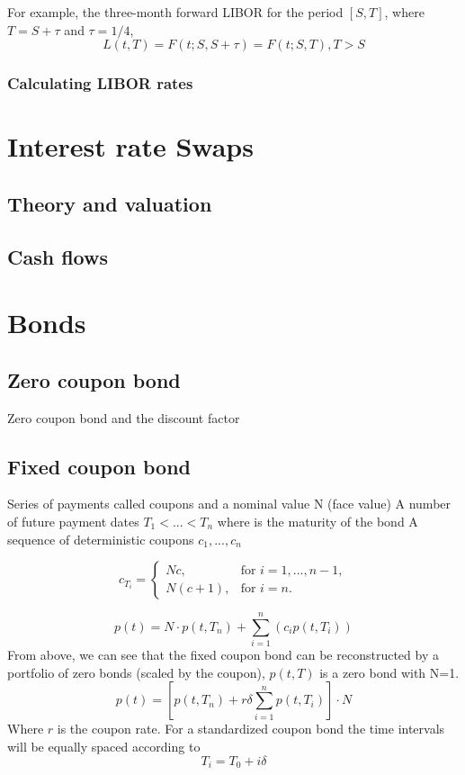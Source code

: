 \documentclass[11pt,a4paper]{article}
\numberwithin{equation}{section}
\begin{document}
For example, the three-month forward LIBOR for the period $[S,T]$, where $T=S+\tau$ and $\tau=1/4$,
\[
L(t,T) = F(t;S,S+\tau) = F(t;S,T), T>S
\]

\subsubsection{Calculating LIBOR rates}

\section{Interest rate Swaps}
\subsection{Theory and valuation}
\subsection{Cash flows}
\section{Bonds}
\label{sec:fi}

\subsection{Zero coupon bond}
Zero coupon bond and the discount factor

\subsection{Fixed coupon bond}
Series of payments called coupons and a nominal value N (face value)
A number of future payment dates $T_1 < ... < T_n$ where is the maturity of the bond
A sequence of deterministic coupons $c_1, ..., c_n$

\[ c_{T_i} = \left\{
\begin{array}{ll}
  Nc, & \text{for } i=1,...,n-1,  \\
  N(c+1), &\text{for } i=n.
\end{array} \right.\]

\[
p(t) = N \cdot p(t,T_n)+\sum_{i=1}^{n} (c_ip(t,T_i))
\]
From above, we can see that the fixed coupon bond can be reconstructed by a portfolio of zero
bonds (scaled by the coupon), $p(t,T)$ is a zero bond with N=1.
\[
p(t)=\left[p(t,T_n)+r\delta\sum_{i=1}^{n} p(t,T_i)\right]\cdot N
\]
Where $r$ is the coupon rate. For a standardized coupon bond the time intervals will be equally
spaced according to
\[
T_i=T_0+i\delta
\]
\end{document}
